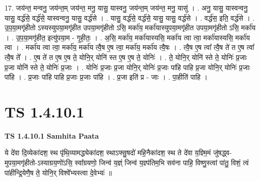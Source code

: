 \documentclass[17pt]{extarticle}
\begin{document}
17. जय॑न्त॒ मन्वनु॒ जय॑न्त॒म् जय॑न्त॒ मनु॒ यासु॒ यास्वनु॒ जय॑न्त॒म् जय॑न्त॒ मनु॒ यासु॑ । . अनु॒ यासु॒ यास्वन्वनु॒ यासु॒ वर्द्ध॑से॒ वर्द्ध॑से॒ यास्वन्वनु॒ यासु॒ वर्द्ध॑से । . यासु॒ वर्द्ध॑से॒ वर्द्ध॑से॒ यासु॒ यासु॒ वर्द्ध॑से । . वर्द्ध॑स॒ इति॒ वर्द्ध॑से । . उ॒प॒या॒मगृ॑हीतो ऽस्यस्युपया॒मगृ॑हीत उपया॒मगृ॑हीतो ऽसि॒ मर्का॑य॒ मर्का॑यास्युपया॒मगृ॑हीत उपया॒मगृ॑हीतो ऽसि॒ मर्का॑य । . उ॒प॒या॒मगृ॑हीत॒ इत्यु॑पया॒म - गृ॒ही॒तः॒ । . अ॒सि॒ मर्का॑य॒ मर्का॑यास्यसि॒ मर्का॑य त्वा त्वा॒ मर्का॑यास्यसि॒ मर्का॑य त्वा । . मर्का॑य त्वा त्वा॒ मर्का॑य॒ मर्का॑य त्वै॒ष ए॒ष त्वा॒ मर्का॑य॒ मर्का॑य त्वै॒षः । . त्वै॒ष ए॒ष त्वा᳚ त्वै॒ष ते॑ त ए॒ष त्वा᳚ त्वै॒ष ते᳚ । . ए॒ष ते॑ त ए॒ष ए॒ष ते॒ योनि॒र् योनि॑ स्त ए॒ष ए॒ष ते॒ योनिः॑ । . ते॒ योनि॒र् योनि॑ स्ते ते॒ योनिः॑ प्र॒जाः प्र॒जा योनि॑ स्ते ते॒ योनिः॑ प्र॒जाः । . योनिः॑ प्र॒जाः प्र॒जा योनि॒र् योनिः॑ प्र॒जाः पा॑हि पाहि प्र॒जा योनि॒र् योनिः॑ प्र॒जाः पा॑हि । . प्र॒जाः पा॑हि पाहि प्र॒जाः प्र॒जाः पा॑हि । . प्र॒जा इति॑ प्र - जाः । . पा॒हीति॑ पाहि । \newline
\pagebreak
{}

\section{ TS 1.4.10.1 }

\textbf{TS 1.4.10.1 } \newline
\textbf{Samhita Paata} \newline

ये दे॑वा दि॒व्येका॑दश॒ स्थ पृ॑थि॒व्यामद्ध्येका॑दश॒ स्थाऽफ्सु॒षदो॑ महि॒नैका॑दश॒ स्थ ते दे॑वा य॒ज्ञ्मि॒मं जु॑षद्ध्व-मुपया॒मगृ॑हीतो-ऽस्याग्रय॒णो॑ऽसि॒ स्वा᳚ग्रयणो॒ जिन्व॑ य॒ज्ञ्ं जिन्व॑ य॒ज्ञ्प॑तिम॒भि सव॑ना पाहि॒ विष्णु॒स्त्वां पा॑तु॒ विशं॒ त्वं पा॑हीन्द्रि॒येणै॒ष ते॒ योनि॒र् विश्वे᳚भ्यस्त्वा दे॒वेभ्यः॑ ॥ \newline
\end{document}
